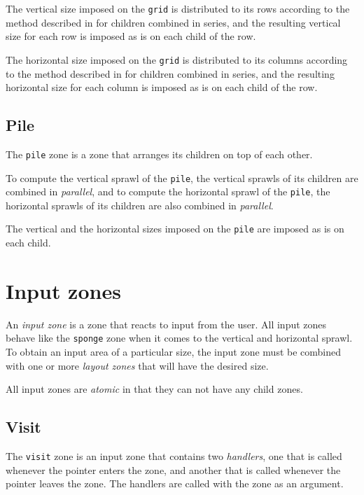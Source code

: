 \documentclass{report}
\def\code#1{\texttt{#1}}
\begin{document}
The vertical size imposed on the \code{grid} is distributed to its
rows according to the method described in
 for children combined in
series, and the resulting vertical size for each row is imposed as is
on each child of the row.

The horizontal size imposed on the \code{grid} is distributed to its
columns according to the method described in
 for children combined in
series, and the resulting horizontal size for each column is imposed
as is on each child of the row.

\subsection{Pile}
\label{sec-zones-layout-pile}

The \code{pile} zone is a zone that arranges its children on top of
each other.

To compute the vertical sprawl of the \code{pile}, the vertical
sprawls of its children are combined in \emph{parallel}, and to
compute the horizontal sprawl of the \code{pile}, the horizontal
sprawls of its children are also combined in \emph{parallel}. 


The vertical and the horizontal sizes imposed on the \code{pile}
are imposed as is on each child.

\section{Input zones}
\label{sec-zones-input}

An \emph{input zone} is a zone that reacts to input from the user.
All input zones behave like the \code{sponge} zone when it comes to
the vertical and horizontal sprawl.  To obtain an input area of a
particular size, the input zone must be combined with one or more
\emph{layout zones} that will have the desired size.

All input zones are \emph{atomic} in that they can not have any child
zones.

\subsection{Visit}
\label{sec-zones-input-visit}

The \code{visit} zone is an input zone that contains two
\emph{handlers}, one that is called whenever the pointer enters the
zone, and another that is called whenever the pointer leaves the zone.
The handlers are called with the zone as an argument.
\end{document}
